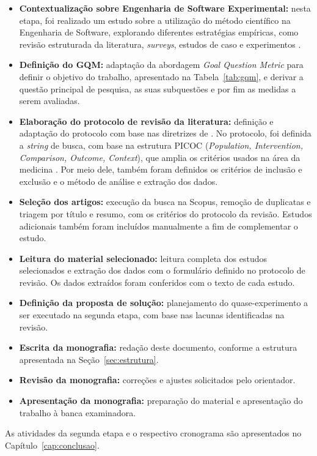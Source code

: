 \begin{itemize}
  \item \textbf{Contextualização sobre Engenharia de Software Experimental:} nesta etapa, foi realizado um estudo sobre a utilização do método científico na Engenharia de Software, explorando diferentes estratégias empíricas, como revisão estruturada da literatura, \textit{surveys}, estudos de caso e experimentos \cite{wohlin2000,kitchenham2007}.
  \item \textbf{Definição do GQM:} adaptação da abordagem \textit{Goal Question Metric} \cite{basili1994} para definir o objetivo do trabalho, apresentado na Tabela~\ref{tab:gqm}, e derivar a questão principal de pesquisa, as suas subquestões e por fim as medidas a serem avaliadas.
  \item \textbf{Elaboração do protocolo de revisão da literatura:} definição e adaptação do protocolo com base nas diretrizes de . No protocolo, foi definida a \textit{string} de busca, com base na estrutura PICOC (\textit{Population, Intervention, Comparison, Outcome, Context}), que amplia os critérios usados na área da medicina \cite{pai2004}. Por meio dele, também foram definidos os critérios de inclusão e exclusão e o método de análise e extração dos dados.
  \item \textbf{Seleção dos artigos:} execução da busca na Scopus, remoção de duplicatas e triagem por título e resumo, com os critérios do protocolo da revisão. Estudos adicionais também foram incluídos manualmente a fim de complementar o estudo.
  \item \textbf{Leitura do material selecionado:} leitura completa dos estudos selecionados e extração dos dados com o formulário definido no protocolo de revisão. Os dados extraídos foram conferidos com o texto de cada estudo.
  \item \textbf{Definição da proposta de solução:} planejamento do quase-experimento a ser executado na segunda etapa, com base nas lacunas identificadas na revisão.
  \item \textbf{Escrita da monografia:} redação deste documento, conforme a estrutura apresentada na Seção~\ref{sec:estrutura}.
  \item \textbf{Revisão da monografia:} correções e ajustes solicitados pelo orientador.
  \item \textbf{Apresentação da monografia:} preparação do material e apresentação do trabalho à banca examinadora.
\end{itemize}

As atividades da segunda etapa e o respectivo cronograma são apresentados no Capítulo~\ref{cap:conclusao}.
